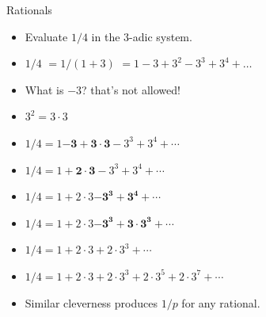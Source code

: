 \documentclass[8pt]{beamer}
\begin{document}
\begin{frame}{Rationals}
\begin{itemize}
\item Evaluate $1/4$ in the $3$-adic system. \pause
\item $1/4$ \pause $ = 1/(1+3)$ \pause $ = 1 - 3 + 3^2 - 3^3 + 3^4 + \dots$\pause
\item What is $-3$? that's not allowed! \pause
\item $3^2 = 3 \cdot 3$ \pause
\item $1/4 = 1 \mathbf{- 3 + 3\cdot 3} - 3^3 + 3^4 + \cdots$ \pause
\item $1/4 = 1  + \mathbf{2\cdot 3} - 3^3 + 3^4 + \cdots$ \pause
\item $1/4 = 1  + 2\cdot 3 \mathbf{- 3^3 + 3^4} + \cdots$ \pause
\item $1/4 = 1  + 2\cdot 3 \mathbf{- 3^3 + 3\cdot 3^3} + \cdots$ \pause
\item $1/4 = 1  + 2\cdot 3 + 2\cdot 3^3 + \cdots$ \pause
\item $1/4 = 1  + 2\cdot 3 + 2\cdot 3^3 + 2\cdot 3^5 + 2\cdot 3^7 + \cdots$ \pause
\item Similar cleverness produces $1/p$ for any rational. \pause
\end{itemize}
\end{frame}
\end{document}
